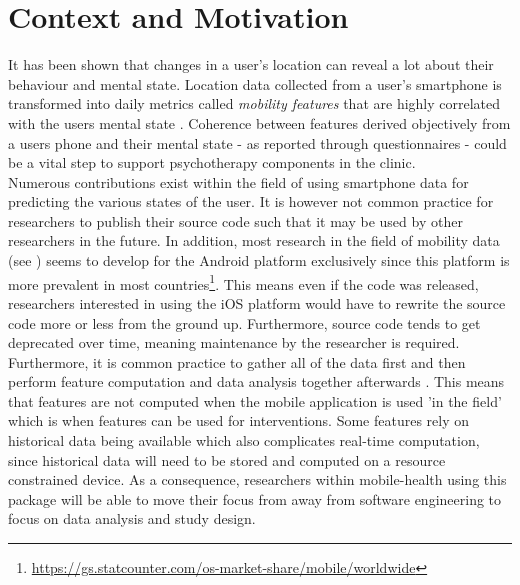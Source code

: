 \section{Context and Motivation}



It has been shown that changes in a user's location can reveal a lot about their behaviour and mental state. Location data collected from a user's smartphone is transformed into daily metrics called \textit{mobility features} that are highly correlated with the users mental state \cite{Saeb2015, Canzian2015}. Coherence between features derived objectively from a users phone and their mental state - as reported through questionnaires - could be a vital step to support psychotherapy components in the clinic.\\

Numerous contributions exist within the field of using smartphone data for predicting the various states of the user. It is however not common practice for researchers to publish their source code such that it may be used by other researchers in the future. In addition, most research in the field of mobility data (see \cite{Saeb2015, saeb2016, Canzian2015, extraction-of-behavioural-features}) seems to develop for the Android platform exclusively since this platform is more prevalent in most countries\footnote{\url{https://gs.statcounter.com/os-market-share/mobile/worldwide}}. This means even if the code was released, researchers interested in using the iOS platform would have to rewrite the source code more or less from the ground up. Furthermore, source code tends to get deprecated over time, meaning maintenance by the researcher is required. \\

Furthermore, it is common practice to gather all of the data first and then perform feature computation and data analysis together afterwards \cite{Saeb2015, saeb2016, sparse-location-2014, extraction-of-behavioural-features}. This means that features are not computed when the mobile application is used 'in the field' which is when features can be used for interventions. Some features rely on historical data being available which also complicates real-time computation, since historical data will need to be stored and computed on a resource constrained device. As a consequence, researchers within mobile-health using this package will be able to move their focus from away from software engineering to focus on data analysis and study design.\\

